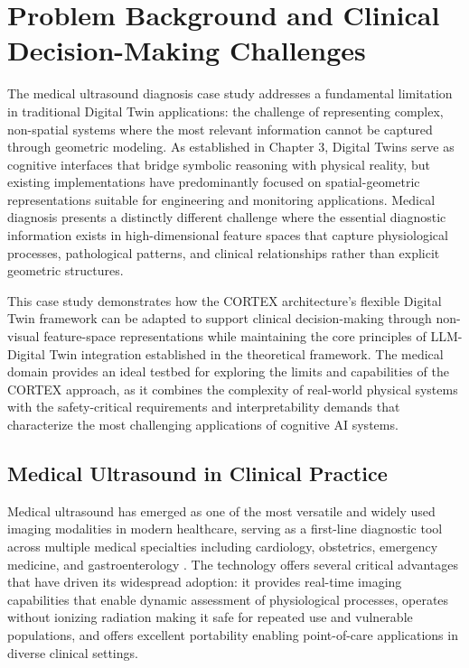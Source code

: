 \section{Problem Background and Clinical Decision-Making Challenges}

The medical ultrasound diagnosis case study addresses a fundamental limitation in traditional Digital Twin applications: the challenge of representing complex, non-spatial systems where the most relevant information cannot be captured through geometric modeling. As established in Chapter 3, Digital Twins serve as cognitive interfaces that bridge symbolic reasoning with physical reality, but existing implementations have predominantly focused on spatial-geometric representations suitable for engineering and monitoring applications. Medical diagnosis presents a distinctly different challenge where the essential diagnostic information exists in high-dimensional feature spaces that capture physiological processes, pathological patterns, and clinical relationships rather than explicit geometric structures.

This case study demonstrates how the CORTEX architecture's flexible Digital Twin framework can be adapted to support clinical decision-making through non-visual feature-space representations while maintaining the core principles of LLM-Digital Twin integration established in the theoretical framework. The medical domain provides an ideal testbed for exploring the limits and capabilities of the CORTEX approach, as it combines the complexity of real-world physical systems with the safety-critical requirements and interpretability demands that characterize the most challenging applications of cognitive AI systems.

\subsection{Medical Ultrasound in Clinical Practice}

Medical ultrasound has emerged as one of the most versatile and widely used imaging modalities in modern healthcare, serving as a first-line diagnostic tool across multiple medical specialties including cardiology, obstetrics, emergency medicine, and gastroenterology \cite{dietrich2017efsumb}. The technology offers several critical advantages that have driven its widespread adoption: it provides real-time imaging capabilities that enable dynamic assessment of physiological processes, operates without ionizing radiation making it safe for repeated use and vulnerable populations, and offers excellent portability enabling point-of-care applications in diverse clinical settings.

